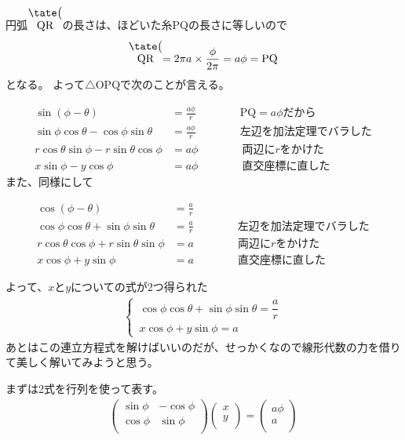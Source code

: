 円弧$\ko{QR}$の長さは、ほどいた糸$\mathrm{PQ}$の長さに等しいので
\begin{align*}
  \ko{QR} = 2\pi a \times \frac{\phi}{2\pi} = a\phi = \mathrm{PQ}
\end{align*}
となる。
よって$\triangle \mathrm{OPQ}$で次のことが言える。
\begin{spacing}{0.2}
\end{spacing}
  \begin{align*}
    \sin(\phi - \theta) &= \frac{a\phi}{r} \qquad\qquad \text{$\mathrm{PQ} = a\phi$だから}\\
    \sin\phi \cos\theta - \cos\phi \sin\theta &= \frac{a\phi}{r} \qquad\qquad \text{左辺を加法定理でバラした}\\
    r\cos\theta \sin\phi - r\sin\theta \cos\phi &= a\phi \qquad\qquad \text{両辺に$r$をかけた}\\
    x\sin\phi - y\cos\phi &= a\phi \qquad\qquad \text{直交座標に直した}
  \end{align*}
また、同様にして
\begin{spacing}{1}
  \begin{align*}
    \cos(\phi - \theta) &= \frac{a}{r}\\
    \cos\phi \cos\theta + \sin\phi \sin\theta &= \frac{a}{r} \qquad\qquad \text{左辺を加法定理でバラした}\\
    r\cos\theta \cos\phi + r\sin\theta \sin\phi &= a \qquad\qquad \text{両辺に$r$をかけた}\\
    x\cos\phi + y\sin\phi &= a \qquad\qquad \text{直交座標に直した}
  \end{align*}
\end{spacing}\noindent
よって、$x$と$y$についての式が2つ得られた
\begin{align*}
  \begin{cases}
  \,\cos\phi \cos\theta + \sin\phi \sin\theta = \dfrac{a}{r}\\
  \,x\cos\phi + y\sin\phi = a
  \end{cases}
\end{align*}
あとはこの連立方程式を解けばいいのだが、せっかくなので線形代数の力を借りて美しく解いてみようと思う。\par
まずは2式を行列を使って表す。
\begin{align*}
  \begin{pmatrix}
    \sin\phi & -\cos\phi \\
    \cos\phi & \sin\phi \\
  \end{pmatrix}
  \begin{pmatrix}
    x\\y\\
  \end{pmatrix}
  =
  \begin{pmatrix}
    a\phi\\a\\
  \end{pmatrix}
\end{align*}
